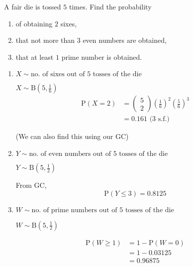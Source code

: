 \documentclass[11pt,a4paper]{book}
\begin{document}
\begin{example}

A fair die is tossed $5$ times. Find the probability

\begin{enumerate}[label=(\alph*)]

\item  of obtaining $2$ sixes,

\item  that not more than $3$ even numbers are obtained,

\item  that at least $1$ prime number is obtained.

\end{enumerate}

\Solution

\begin{enumerate}[label=(\alph*)]

\item  $X\sim\text{no. of sixes out of 5 tosses of the die}$

${\displaystyle X\sim\text{B}\left(5,\frac{1}{6}\right)}$
\begin{align*}
{\displaystyle \text{P}\left(X=2\right)} & =\begin{pmatrix}5\\
2
\end{pmatrix}\left(\frac{1}{6}\right)^{2}\left(\frac{5}{6}\right)^{3}\\
 & =0.161\text{ (3 s.f.)}
\end{align*}

(We can also find this using our GC)

\item  $Y\sim\text{no. of even numbers out of 5 tosses of the die}$

${\displaystyle Y\sim\text{B}\left(5,\frac{1}{2}\right)}$

From GC,
\[
\text{P}\left(Y\leq3\right)=0.8125
\]

\item  $W\sim\text{no. of prime numbers out of 5 tosses of the die}$

${\displaystyle W\sim\text{B}\left(5,\frac{1}{2}\right)}$

\begin{align*}
\text{P}\left(W\geq1\right) & =1-\text{P}\left(W=0\right)\\
 & =1-0.03125\\
 & =0.96875
\end{align*}

\end{enumerate}

\end{example}
\end{document}
